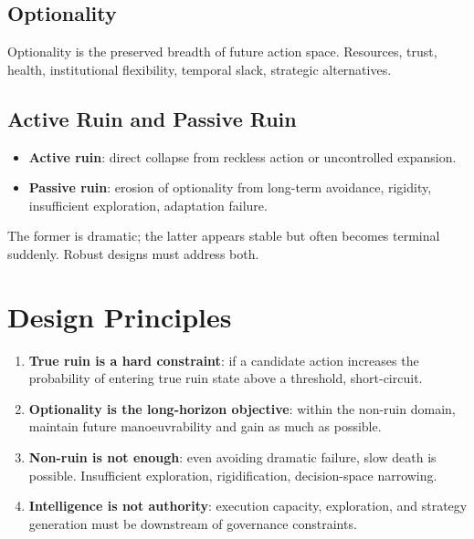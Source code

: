\subsection{Optionality}
\label{sec:omega-optionality}

Optionality is the preserved breadth of future action space.
Resources, trust, health, institutional flexibility, temporal slack,
strategic alternatives.

\subsection{Active Ruin and Passive Ruin}
\label{sec:omega-active-vs-passive}

\begin{itemize}
\item \textbf{Active ruin}: direct collapse from reckless action or
uncontrolled expansion.
\item \textbf{Passive ruin}: erosion of optionality from long-term
avoidance, rigidity, insufficient exploration, adaptation failure.
\end{itemize}

The former is dramatic; the latter appears stable but often becomes
terminal suddenly. Robust designs must address both.

\section{Design Principles}
\label{sec:omega-design-principles}

\begin{enumerate}
\item \textbf{True ruin is a hard constraint}: if a candidate action
increases the probability of entering true ruin state above a
threshold, short-circuit.
\item \textbf{Optionality is the long-horizon objective}: within the
non-ruin domain, maintain future manoeuvrability and gain as much
as possible.
\item \textbf{Non-ruin is not enough}: even avoiding dramatic
failure, slow death is possible. Insufficient exploration,
rigidification, decision-space narrowing.
\item \textbf{Intelligence is not authority}: execution capacity,
exploration, and strategy generation must be downstream of
governance constraints.
\end{enumerate}

